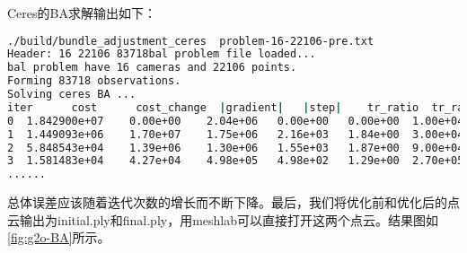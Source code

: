 Ceres的BA求解输出如下：
\begin{lstlisting}[language=sh,caption=终端输出]
./build/bundle_adjustment_ceres  problem-16-22106-pre.txt                
Header: 16 22106 83718bal problem file loaded...
bal problem have 16 cameras and 22106 points. 
Forming 83718 observations. 
Solving ceres BA ... 
iter      cost      cost_change  |gradient|   |step|    tr_ratio  tr_radius  ls_iter  iter_time  total_time
0  1.842900e+07    0.00e+00    2.04e+06   0.00e+00   0.00e+00  1.00e+04        0    6.10e-02    2.24e-01
1  1.449093e+06    1.70e+07    1.75e+06   2.16e+03   1.84e+00  3.00e+04        1    1.79e-01    4.03e-01
2  5.848543e+04    1.39e+06    1.30e+06   1.55e+03   1.87e+00  9.00e+04        1    1.56e-01    5.59e-01
3  1.581483e+04    4.27e+04    4.98e+05   4.98e+02   1.29e+00  2.70e+05        1    1.51e-01    7.10e-01
......
\end{lstlisting}
总体误差应该随着迭代次数的增长而不断下降。最后，我们将优化前和优化后的点云输出为initial.ply和final.ply，用meshlab可以直接打开这两个点云。结果图如\autoref{fig:g2o-BA}所示。


